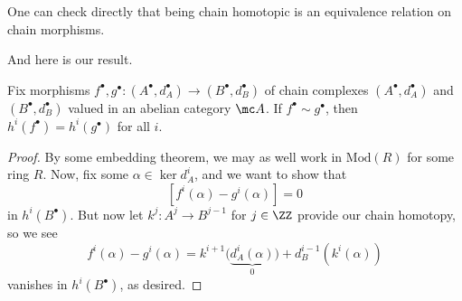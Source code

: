 \documentclass[../notes.tex]{subfiles}
\begin{document}
\begin{remark}
	One can check directly that being chain homotopic is an equivalence relation on chain morphisms.
\end{remark}
And here is our result.
\begin{proposition}
	Fix morphisms $f^\bullet,g^\bullet\colon(A^\bullet,d_A^\bullet)\to(B^\bullet,d_B^\bullet)$ of chain complexes $(A^\bullet,d_A^\bullet)$ and $(B^\bullet,d_B^\bullet)$ valued in an abelian category $\mc A$. If $f^\bullet\sim g^\bullet$, then $h^i(f^\bullet)=h^i(g^\bullet)$ for all $i$.
\end{proposition}
\begin{proof}
	By some embedding theorem, we may as well work in $\mathrm{Mod}(R)$ for some ring $R$. Now, fix some $\alpha\in\ker d_A^i$, and we want to show that
	\[\left[f^i(\alpha)-g^i(\alpha)\right]=0\]
	in $h^i(B^\bullet)$. But now let $k^j\colon A^j\to B^{j-1}$ for $j\in\ZZ$ provide our chain homotopy, so we see
	\[f^i(\alpha)-g^i(\alpha)=k^{i+1}\big(\underbrace{d_A^i(\alpha)}_0\big)+d_B^{i-1}\left(k^i(\alpha)\right)\]
	vanishes in $h^i(B^\bullet)$, as desired.
\end{proof}
\end{document}
